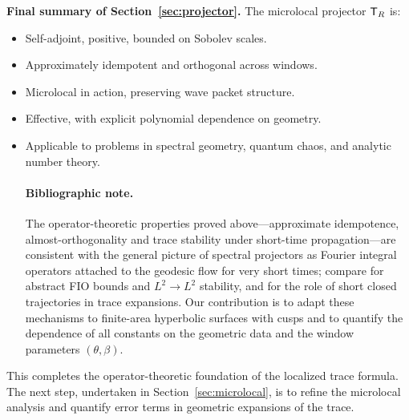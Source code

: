 \bigskip
\noindent\textbf{Final summary of Section~\ref{sec:projector}.} The microlocal projector $\mathsf{T}_R$ is:
\begin{itemize}
\item Self-adjoint, positive, bounded on Sobolev scales.
\item Approximately idempotent and orthogonal across windows.
\item Microlocal in action, preserving wave packet structure.
\item Effective, with explicit polynomial dependence on geometry.
\item Applicable to problems in spectral geometry, quantum chaos, and analytic number theory.
\paragraph{Bibliographic note.}
The operator-theoretic properties proved above---approximate idempotence, almost-orthogonality and trace stability under short-time propagation---are consistent with the general picture of spectral projectors as Fourier integral operators attached to the geodesic flow for very short times; compare \cite{hormander1994III,sogge1993} for abstract FIO bounds and $L^2\!\to\!L^2$ stability, and \cite{duistermaatguillemin1975} for the role of short closed trajectories in trace expansions. Our contribution is to adapt these mechanisms to finite-area hyperbolic surfaces with cusps and to quantify the dependence of all constants on the geometric data and the window parameters $(\theta,\beta)$.

\end{itemize}

This completes the operator-theoretic foundation of the localized trace formula. The next step, undertaken in Section~\ref{sec:microlocal}, is to refine the microlocal analysis and quantify error terms in geometric expansions of the trace.
